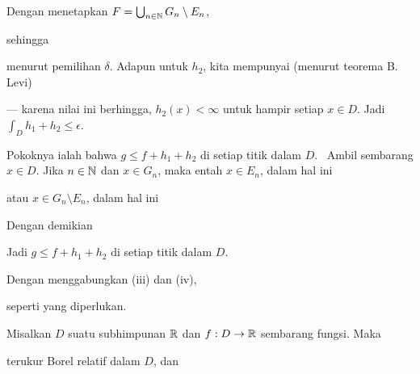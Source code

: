 {\noindent Dengan menetapkan $F=\bigcup_{n\in\Bbb N}G_n\setminus E_n$,


\noindent sehingga


\noindent menurut pemilihan $\delta$. Adapun untuk $h_2$, kita mempunyai
(menurut teorema B. Levi)


\noindent --- karena nilai ini berhingga, $h_2(x)<\infty$ untuk hampir setiap
$x\in D$. Jadi $\int_Dh_1+h_2\le\epsilon$.

\medskip

 Pokoknya ialah bahwa $g\le f+h_1+h_2$ di setiap titik dalam
$D$. \Prf\ Ambil sembarang $x\in D$. Jika $n\in\Bbb N$ dan $x\in G_n$,
maka entah $x\in E_n$, dalam hal ini


\noindent atau $x\in G_n\setminus E_n$, dalam hal ini


\noindent Dengan demikian


\noindent Jadi $g\le f+h_1+h_2$ di setiap titik dalam $D$.

\medskip

 Dengan menggabungkan (iii) dan (iv),


\noindent seperti yang diperlukan.
}%

 Misalkan $D$ suatu subhimpunan $\Bbb R$ dan
$f:D\to\Bbb R$ sembarang fungsi. Maka


\noindent terukur Borel relatif dalam $D$, dan

